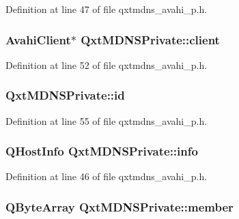 Definition at line 47 of file qxtmdns\-\_\-avahi\-\_\-p.\-h.

\hypertarget{class_qxt_m_d_n_s_private_ab9f30eec80344cb5c8e162a2ca581af4}{
\subsubsection[{client}]{\setlength{\rightskip}{0pt plus 5cm}Avahi\-Client$\ast$ Qxt\-M\-D\-N\-S\-Private\-::client}}\label{class_qxt_m_d_n_s_private_ab9f30eec80344cb5c8e162a2ca581af4}


Definition at line 52 of file qxtmdns\-\_\-avahi\-\_\-p.\-h.

\hypertarget{class_qxt_m_d_n_s_private_ab2f6f2e09886b6cb9f2cd447fc90399a}{
\subsubsection[{id}]{ Qxt\-M\-D\-N\-S\-Private\-::id}}\label{class_qxt_m_d_n_s_private_ab2f6f2e09886b6cb9f2cd447fc90399a}


Definition at line 55 of file qxtmdns\-\_\-avahi\-\_\-p.\-h.

\hypertarget{class_qxt_m_d_n_s_private_a094d2f2bc58a87ba07e2afa43f91652f}{
\subsubsection[{info}]{\setlength{\rightskip}{0pt plus 5cm}Q\-Host\-Info Qxt\-M\-D\-N\-S\-Private\-::info}}\label{class_qxt_m_d_n_s_private_a094d2f2bc58a87ba07e2afa43f91652f}


Definition at line 46 of file qxtmdns\-\_\-avahi\-\_\-p.\-h.

\hypertarget{class_qxt_m_d_n_s_private_a9bbde3018309b137822a25b740e1f8c8}{
\subsubsection[{member}]{\setlength{\rightskip}{0pt plus 5cm}Q\-Byte\-Array Qxt\-M\-D\-N\-S\-Private\-::member}}\label{class_qxt_m_d_n_s_private_a9bbde3018309b137822a25b740e1f8c8}


